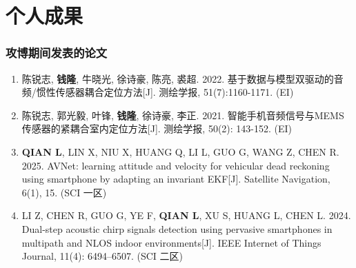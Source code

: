 

\section{个人成果}

\begin{frame}
	\frametitle{攻博期间发表的论文}

	\begin{enumerate}
		\item 陈锐志, \textbf{钱隆}, 牛晓光, 徐诗豪, 陈亮, 裘超. 2022. 基于数据与模型双驱动的音频/惯性传感器耦合定位方法[J]. 测绘学报, 51(7):1160-1171. (EI)
		
		\item 陈锐志, 郭光毅, 叶锋, \textbf{钱隆}, 徐诗豪, 李正. 2021. 智能手机音频信号与MEMS传感器的紧耦合室内定位方法[J]. 测绘学报, 50(2): 143-152. (EI)
		
		\item \textbf{QIAN L}, LIN X, NIU X, HUANG Q, LI L, GUO G, WANG Z, CHEN R. 2025. AVNet: learning attitude and velocity for vehicular dead reckoning using smartphone by adapting an invariant EKF[J]. Satellite Navigation, 6(1), 15. (SCI 一区)  
		
		\item LI Z, CHEN R, GUO G, YE F, \textbf{QIAN L}, XU S, HUANG L, CHEN L. 2024. Dual-step acoustic chirp signals detection using pervasive smartphones in multipath and NLOS indoor environments[J]. IEEE Internet of Things Journal, 11(4): 6494–6507. (SCI 二区) 

	\end{enumerate}
\end{frame}

